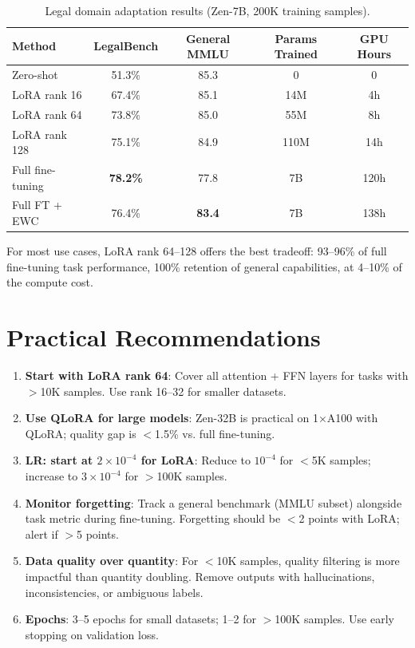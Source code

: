 \documentclass[11pt,a4paper]{article}
\begin{document}
\begin{table}[H]
\centering
\begin{tabular}{lcccc}
\toprule
\textbf{Method} & \textbf{LegalBench} & \textbf{General MMLU} & \textbf{Params Trained} & \textbf{GPU Hours} \\
\midrule
Zero-shot & 51.3\% & 85.3 & 0 & 0 \\
LoRA rank 16 & 67.4\% & 85.1 & 14M & 4h \\
LoRA rank 64 & 73.8\% & 85.0 & 55M & 8h \\
LoRA rank 128 & 75.1\% & 84.9 & 110M & 14h \\
Full fine-tuning & \textbf{78.2\%} & 77.8 & 7B & 120h \\
Full FT + EWC & 76.4\% & \textbf{83.4} & 7B & 138h \\
\bottomrule
\end{tabular}
\caption{Legal domain adaptation results (Zen-7B, 200K training samples).}
\end{table}

For most use cases, LoRA rank 64--128 offers the best tradeoff: 93--96\% of full
fine-tuning task performance, 100\% retention of general capabilities, at 4--10\%
of the compute cost.

\section{Practical Recommendations}

\begin{enumerate}
  \item \textbf{Start with LoRA rank 64}: Cover all attention + FFN layers for
    tasks with $>$10K samples. Use rank 16--32 for smaller datasets.
  \item \textbf{Use QLoRA for large models}: Zen-32B is practical on 1$\times$A100
    with QLoRA; quality gap is $<$1.5\% vs. full fine-tuning.
  \item \textbf{LR: start at $2\times10^{-4}$ for LoRA}: Reduce to $10^{-4}$ for
    $<$5K samples; increase to $3\times10^{-4}$ for $>$100K samples.
  \item \textbf{Monitor forgetting}: Track a general benchmark (MMLU subset)
    alongside task metric during fine-tuning. Forgetting should be $<$2 points
    with LoRA; alert if $>$5 points.
  \item \textbf{Data quality over quantity}: For $<$10K samples, quality filtering
    is more impactful than quantity doubling. Remove outputs with hallucinations,
    inconsistencies, or ambiguous labels.
  \item \textbf{Epochs}: 3--5 epochs for small datasets; 1--2 for $>$100K samples.
    Use early stopping on validation loss.
\end{enumerate}
\end{document}
